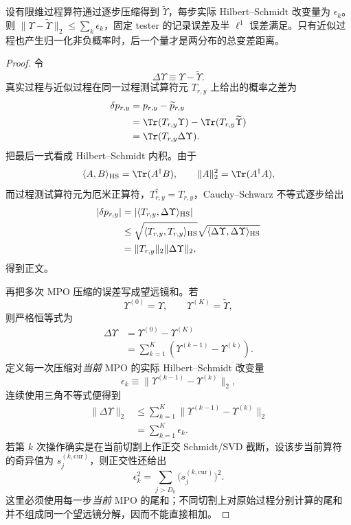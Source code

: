 \begin{proposition}[过程压缩的可观测误差界]
设有限维过程算符通过逐步压缩得到 $\widetilde\Upsilon$，每步实际 Hilbert--Schmidt 改变量为 $\epsilon_k$。则 $\|\Upsilon-\widetilde\Upsilon\|_2\le\sum_k\epsilon_k$，固定 tester 的记录误差及半 $\ell^1$ 误差满足。只有近似过程也产生归一化非负概率时，后一个量才是两分布的总变差距离。
\end{proposition}
\begin{proof}
令
\[
\Delta\Upsilon\equiv\Upsilon-\widetilde\Upsilon.
\]
真实过程与近似过程在同一过程测试算符元 $T_{r,y}$ 上给出的概率之差为
\begin{align*}
\delta p_{r,y}
&=p_{r,y}-\widetilde p_{r,y}\\
&=\Tr(T_{r,y}\Upsilon)-\Tr(T_{r,y}\widetilde\Upsilon)\\
&=\Tr(T_{r,y}\Delta\Upsilon).
\end{align*}
把最后一式看成 Hilbert--Schmidt 内积。由于
\[
\langle A,B\rangle_{\rm HS}=\Tr(A^\dagger B),
\qquad
\|A\|_2^2=\Tr(A^\dagger A),
\]
而过程测试算符元为厄米正算符，$T_{r,y}^\dagger=T_{r,y}$，Cauchy--Schwarz 不等式逐步给出
\begin{align*}
|\delta p_{r,y}|
&=|\langle T_{r,y},\Delta\Upsilon\rangle_{\rm HS}|\\
&\le
\sqrt{\langle T_{r,y},T_{r,y}\rangle_{\rm HS}}
\sqrt{\langle\Delta\Upsilon,\Delta\Upsilon\rangle_{\rm HS}}\\
&=\|T_{r,y}\|_2\|\Delta\Upsilon\|_2,
\end{align*}
得到正文。

再把多次 MPO 压缩的误差写成望远镜和。若
\[
\Upsilon^{(0)}=\Upsilon,
\qquad
\Upsilon^{(K)}=\widetilde\Upsilon,
\]
则严格恒等式为
\begin{align*}
\Delta\Upsilon
&=\Upsilon^{(0)}-\Upsilon^{(K)}\\
&=\sum_{k=1}^{K}
\left(\Upsilon^{(k-1)}-\Upsilon^{(k)}\right).
\end{align*}
定义每一次压缩对\emph{当前} MPO 的实际 Hilbert--Schmidt 改变量
\[
\epsilon_k
\equiv
\|\Upsilon^{(k-1)}-\Upsilon^{(k)}\|_2,
\]
连续使用三角不等式便得到
\begin{align*}
\|\Delta\Upsilon\|_2
&\le
\sum_{k=1}^{K}
\|\Upsilon^{(k-1)}-\Upsilon^{(k)}\|_2\\
&=\sum_{k=1}^{K}\epsilon_k.
\end{align*}
若第 $k$ 次操作确实是在当前切割上作正交 Schmidt/SVD 截断，设该步当前算符的奇异值为 $s_j^{(k,\mathrm{cur})}$，则正交性还给出
\[
\epsilon_k^2
=\sum_{j>D_k}\bigl(s_j^{(k,\mathrm{cur})}\bigr)^2.
\]
这里必须使用每一步\emph{当前} MPO 的尾和；不同切割上对原始过程分别计算的尾和并不组成同一个望远镜分解，因而不能直接相加。


\end{proof}
